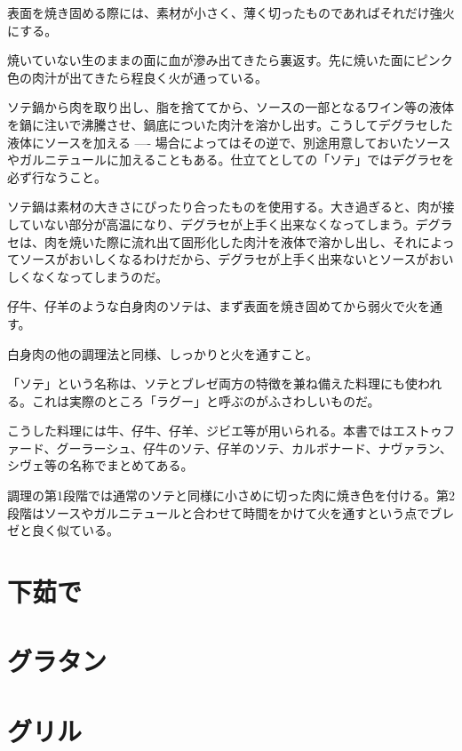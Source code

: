表面を焼き固める際には、素材が小さく、薄く切ったものであればそれだけ強火にする。

焼いていない生のままの面に血が滲み出てきたら裏返す。先に焼いた面にピンク色の肉汁が出てきたら程良く火が通っている。

ソテ鍋から肉を取り出し、脂を捨ててから、ソースの一部となるワイン等の液体を鍋に注いで沸騰させ、鍋底についた肉汁を溶かし出す。こうしてデグラセした液体にソースを加える
----
場合によってはその逆で、別途用意しておいたソースやガルニテュールに加えることもある。仕立てとしての「ソテ」ではデグラセを必ず行なうこと。

ソテ鍋は素材の大きさにぴったり合ったものを使用する。大き過ぎると、肉が接していない部分が高温になり、デグラセが上手く出来なくなってしまう。デグラセは、肉を焼いた際に流れ出て固形化した肉汁を液体で溶かし出し、それによってソースがおいしくなるわけだから、デグラセが上手く出来ないとソースがおいしくなくなってしまうのだ。

仔牛、仔羊のような白身肉のソテは、まず表面を焼き固めてから弱火で火を通す。

白身肉の他の調理法と同様、しっかりと火を通すこと。

「ソテ」という名称は、ソテとブレゼ両方の特徴を兼ね備えた料理にも使われる。これは実際のところ「ラグー」と呼ぶのがふさわしいものだ。

こうした料理には牛、仔牛、仔羊、ジビエ等が用いられる。本書ではエストゥファード、グーラーシュ、仔牛のソテ、仔羊のソテ、カルボナード、ナヴァラン、シヴェ等の名称でまとめてある。

調理の第1段階では通常のソテと同様に小さめに切った肉に焼き色を付ける。第2段階はソースやガルニテュールと合わせて時間をかけて火を通すという点でブレゼと良く似ている。

\hypertarget{ux4e0bux8339ux3067}{%
\section{下茹で}\label{ux4e0bux8339ux3067}}

\hypertarget{ux30b0ux30e9ux30bfux30f3}{%
\section{グラタン}\label{ux30b0ux30e9ux30bfux30f3}}

\hypertarget{ux30b0ux30eaux30eb}{%
\section{グリル}\label{ux30b0ux30eaux30eb}}


